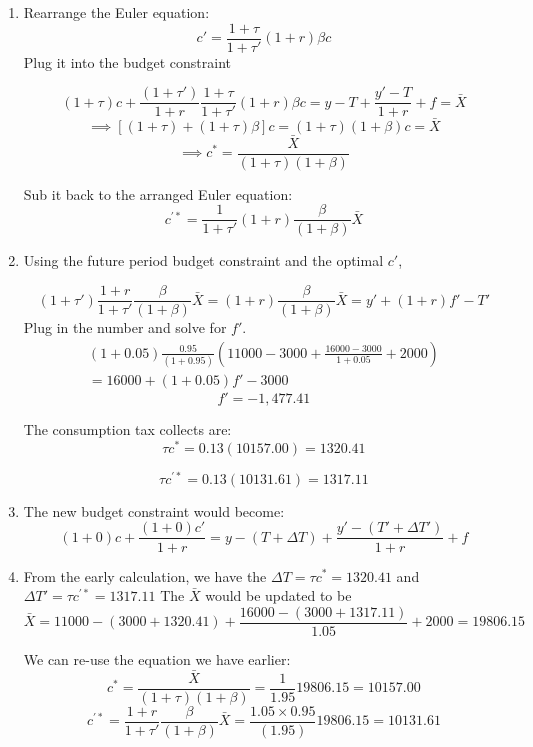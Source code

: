 \documentclass[14pt, oneside]{memoir}
\begin{document}
\begin{enumerate}[label=\textbf{\arabic*.}, itemsep=15pt]
\begin{enumerate}
	Sub in the $\frac{\partial c(c')}{\partial c'}$ and rearrange the equation, we have 
	 \[\frac{c'}{c} = \frac{1+\tau}{1+\tau'} (1+r)\beta\]
	 
	 *Lagrangian method would probably cleaner and easier for students who have already learn the method.
	\item Rearrange the Euler equation:
	\[c' = \frac{1+\tau}{1+\tau'} (1+r)\beta c\]
	\clearpage
	Plug it into the budget constraint
	
	\[(1+\tau)c +\frac{(1+\tau')}{1+r} \frac{1+\tau}{1+\tau'} (1+r)\beta c = y- T + \frac{y'-T}{1+r} +f = \bar{X}\]
	\[\implies \left[(1+\tau) + (1+\tau)\beta\right] c= (1+\tau)(1+\beta) c  = \bar{X}\]
	\[\implies c^* =  \frac{\bar{X}}{(1+\tau)(1+\beta) }\]
	
	Sub it back to the arranged Euler equation:
	\[c^{'*} = \frac{1}{1+\tau'}  (1+r) \frac{\beta }{(1+\beta) } \bar{X} \]
	
	\item 	Using the future period budget constraint and the optimal $c'$, 
	
	\[(1+\tau')\frac{1+r}{1+\tau'}  \frac{\beta }{(1+\beta) } \bar{X} = (1+r) \frac{\beta }{(1+\beta) } \bar{X} = y'+(1+r)f' -T'\]
	Plug in the number and solve for $f'$.
		\begin{multline*}
			(1+0.05)  \frac{0.95}{(1+0.95) }  \left(11000- 3000 + \frac{16000-3000}{1+0.05} +2000 \right) \\ = 16000+(1+0.05)f' -3000
		\end{multline*}
		\[f' = -1,477.41\]
		
		The consumption tax collects are:
		\[\tau c^* = 0.13\left(10157.00\right) = 1320.41\]
		
		\[\tau c^{'*} = 0.13 (10131.61) = 1317.11\]
	\item The new budget constraint would become:
	\[(1+0)c +\frac{(1+0)c'}{1+r} = y- (T + \Delta T) + \frac{y'-(T'+\Delta T')}{1+r} +f\]
	\clearpage
	
	\item 
	From the early calculation, we have the $\Delta T = \tau c^* = 1320.41$ and $\Delta T' = \tau c^{'*} = 1317.11$
	The $\bar{X}$ would be updated to be 
	\[\bar{X} = 11000- (3000 + 1320.41) + \frac{16000-(3000+1317.11)}{1.05} +2000 = 19806.15\]
	
	We can re-use the equation we have earlier:
	\[c^* =  \frac{\bar{X}}{(1+\tau)(1+\beta) } = \frac{1}{1.95} 19806.15 = 10157.00\]
	\[c^{'*} = \frac{1+r}{1+\tau'}  \frac{\beta }{(1+\beta) } \bar{X}  =  \frac{1.05 \times 0.95 }{(1.95) } 19806.15 = 10131.61\]
	

\end{enumerate}
\end{enumerate}
\end{document}
